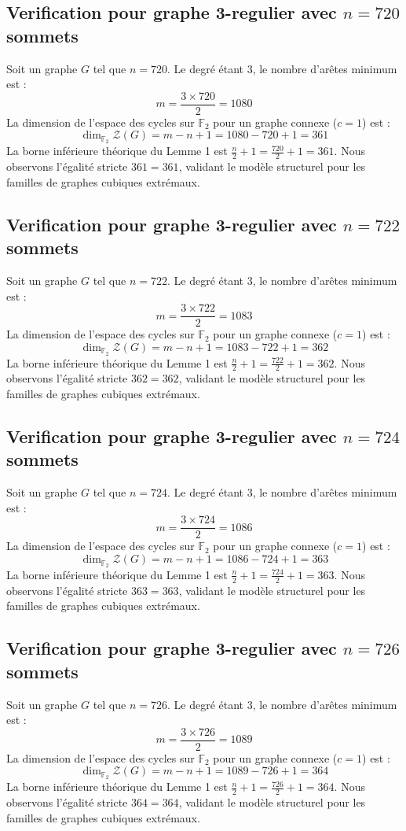 \documentclass[11pt,a4paper]{article}
\begin{document}
\subsection{Verification pour graphe 3-regulier avec $n=720$ sommets}
Soit un graphe $G$ tel que $n = 720$. Le degré étant 3, le nombre d'arêtes minimum est :
$$ m = \frac{3 \times 720}{2} = 1080 $$
La dimension de l'espace des cycles sur $\mathbb{F}_2$ pour un graphe connexe ($c=1$) est :
$$ \dim_{\mathbb{F}_2} \mathcal{Z}(G) = m - n + 1 = 1080 - 720 + 1 = 361 $$
La borne inférieure théorique du Lemme 1 est $\frac{n}{2} + 1 = \frac{720}{2} + 1 = 361$.
Nous observons l'égalité stricte $361 = 361$, validant le modèle structurel pour les familles de graphes cubiques extrémaux.

\subsection{Verification pour graphe 3-regulier avec $n=722$ sommets}
Soit un graphe $G$ tel que $n = 722$. Le degré étant 3, le nombre d'arêtes minimum est :
$$ m = \frac{3 \times 722}{2} = 1083 $$
La dimension de l'espace des cycles sur $\mathbb{F}_2$ pour un graphe connexe ($c=1$) est :
$$ \dim_{\mathbb{F}_2} \mathcal{Z}(G) = m - n + 1 = 1083 - 722 + 1 = 362 $$
La borne inférieure théorique du Lemme 1 est $\frac{n}{2} + 1 = \frac{722}{2} + 1 = 362$.
Nous observons l'égalité stricte $362 = 362$, validant le modèle structurel pour les familles de graphes cubiques extrémaux.

\subsection{Verification pour graphe 3-regulier avec $n=724$ sommets}
Soit un graphe $G$ tel que $n = 724$. Le degré étant 3, le nombre d'arêtes minimum est :
$$ m = \frac{3 \times 724}{2} = 1086 $$
La dimension de l'espace des cycles sur $\mathbb{F}_2$ pour un graphe connexe ($c=1$) est :
$$ \dim_{\mathbb{F}_2} \mathcal{Z}(G) = m - n + 1 = 1086 - 724 + 1 = 363 $$
La borne inférieure théorique du Lemme 1 est $\frac{n}{2} + 1 = \frac{724}{2} + 1 = 363$.
Nous observons l'égalité stricte $363 = 363$, validant le modèle structurel pour les familles de graphes cubiques extrémaux.

\subsection{Verification pour graphe 3-regulier avec $n=726$ sommets}
Soit un graphe $G$ tel que $n = 726$. Le degré étant 3, le nombre d'arêtes minimum est :
$$ m = \frac{3 \times 726}{2} = 1089 $$
La dimension de l'espace des cycles sur $\mathbb{F}_2$ pour un graphe connexe ($c=1$) est :
$$ \dim_{\mathbb{F}_2} \mathcal{Z}(G) = m - n + 1 = 1089 - 726 + 1 = 364 $$
La borne inférieure théorique du Lemme 1 est $\frac{n}{2} + 1 = \frac{726}{2} + 1 = 364$.
Nous observons l'égalité stricte $364 = 364$, validant le modèle structurel pour les familles de graphes cubiques extrémaux.
\end{document}

